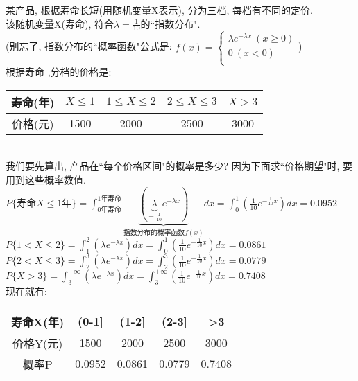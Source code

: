 \documentclass[UTF8]{ctexart}
\begin{document}
\begin{myEnvSample}
	某产品, 根据寿命长短(用随机变量X表示), 分为三档, 每档有不同的定价. \\
	该随机变量X(寿命), 符合$\lambda =\frac{1}{10}$的``指数分布". \\
	(别忘了, 指数分布的``概率函数"公式是: $	f(x)=\left\{ \begin{array}{l}
		\lambda e^{-\lambda x}\ (x\ge 0)\\
		0\ (x<0)\\
	\end{array} \right. 	$) \\

根据寿命 ,分档的价格是:  \\
\begin{tabular}{|c|c|c|c|c|}
	\hline
	寿命(年) & $X \leq 1$ & $1 \leq X \leq 2$ & $2 \leq X \leq 3$ & $X>3$ \\
	\hline
	价格(元) & 1500 & 2000 & 2500 & 3000 \\
	\hline
\end{tabular} \\

我们要先算出, 产品在``每个价格区间"的概率是多少?  因为下面求``价格期望"时, 要用到这些概率数值. \\
$P\{\text{寿命}X\leq 1\text{年\}}=\int_{0\text{年寿命}}^{1\text{年寿命}}{\underset{\text{指数分布的概率函数}f(x)}{\underbrace{\left( \underset{=\frac{1}{10}}{\underbrace{\lambda }}e^{-\lambda x} \right) }}}dx=\int_0^1{\left( \frac{1}{10}e^{-\frac{1}{10}x} \right) dx=0.0952}
$ \\
$P\{1<X\leq 2\}=\int_1^2{\left( \lambda e^{-\lambda x} \right)}dx=\int_0^1{\left( \frac{1}{10}e^{-\frac{1}{10}x} \right) dx=0.0861}
$ \\
$P\{2<X\leq 3\}=\int_2^3{\left( \lambda e^{-\lambda x} \right)}dx=\int_2^3{\left( \frac{1}{10}e^{-\frac{1}{10}x} \right) dx=0.0779}
$ \\
$P\{X>3\}=\int_3^{+\infty}{\left( \lambda e^{-\lambda x} \right)}dx=\int_3^{+\infty}{\left( \frac{1}{10}e^{-\frac{1}{10}x} \right) dx=0.7408}
$ \\

现在就有: \\
\begin{tabular}{|c|c|c|c|c|}
	\hline
	寿命X(年) & (0-1] & (1-2] & (2-3] & >3 \\
	\hline
	价格Y(元) & 1500 & 2000 & 2500 & 3000 \\
	\hline
	概率P & 0.0952 & 0.0861 & 0.0779 & 0.7408 \\
	\hline
\end{tabular} \\


\end{myEnvSample}
\end{document}
